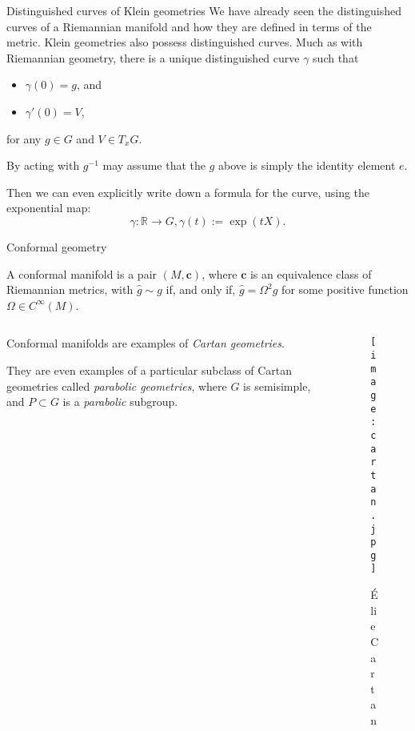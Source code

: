 \documentclass[handout]{beamer}
\renewcommand{\hat}{\widehat}
\newcommand{\RR}{\mathbb{R}}
\begin{document}
\begin{frame}{Distinguished curves of Klein geometries}
  We have already seen the distinguished curves of a Riemannian manifold and how they are defined in terms of the metric.
  Klein geometries also possess distinguished curves. 
  Much as with Riemannian geometry, there is a unique distinguished curve $\gamma$ such that 
  \begin{itemize}
    \item $\gamma(0) = g$, and 
    \item $\gamma'(0) = V$,
  \end{itemize}
  for any $g\in G$ and $V \in T_x G$.

  By acting with $g^{-1}$ may assume that the $g$ above is simply the identity element $e$.

  Then we can even explicitly write down a formula for the curve, using the exponential map:
  \[
    \gamma : \RR \to G, \gamma(t) := \exp(tX).
  \]
\end{frame}

\begin{frame}{Conformal geometry}

  \begin{definition}
    A conformal manifold is a pair \( (M, \bm{c}) \), where \( \bm{c} \) is an equivalence class of Riemannian metrics, with \( \hat{g} \sim g \) if, and only if, \( \hat{g} = \Omega^2 g \) for some positive function \( \Omega \in C^\infty (M) \).
  \end{definition}

  \begin{columns}
    \begin{column}{0.6\textwidth}
      \pause
      Conformal manifolds are examples of \emph{Cartan geometries}.
      \vspace{1em}

      \pause
      They are even examples of 
      a particular subclass of Cartan geometries called \emph{parabolic geometries}, where \( G \) is semisimple, and \( P \subset G \) is a \emph{parabolic} subgroup.
    \end{column}
      \begin{column}{0.4\textwidth}
        \hspace{1.5em}
        \begin{figure}
          \texttt{[image: cartan.jpg]}
          \caption*{\'{E}lie Cartan}
        \end{figure}
      \end{column}
  \end{columns}

\end{frame}
\end{document}
